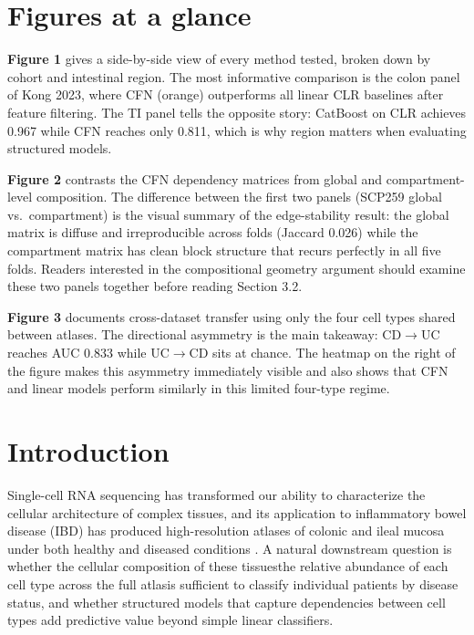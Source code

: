 \documentclass[11pt,letterpaper]{article}
\begin{document}
\section*{Figures at a glance}

\textbf{Figure 1} gives a side-by-side view of every method tested, broken
down by cohort and intestinal region. The most informative comparison is the
colon panel of Kong 2023, where CFN (orange) outperforms all linear CLR
baselines after feature filtering. The TI panel tells the opposite story:
CatBoost on CLR achieves 0.967 while CFN reaches only 0.811, which is why
region matters when evaluating structured models.

\textbf{Figure 2} contrasts the CFN dependency matrices from global and
compartment-level composition. The difference between the first two panels
(SCP259 global vs.\ compartment) is the visual summary of the edge-stability
result: the global matrix is diffuse and irreproducible across folds (Jaccard
0.026) while the compartment matrix has clean block structure that recurs
perfectly in all five folds. Readers interested in the compositional geometry
argument should examine these two panels together before reading Section 3.2.

\textbf{Figure 3} documents cross-dataset transfer using only the four cell
types shared between atlases. The directional asymmetry is the main takeaway:
CD$\rightarrow$UC reaches AUC 0.833 while UC$\rightarrow$CD sits at chance.
The heatmap on the right of the figure makes this asymmetry immediately visible
and also shows that CFN and linear models perform similarly in this limited
four-type regime.

\section{Introduction}

Single-cell RNA sequencing has transformed our ability to characterize the
cellular architecture of complex tissues, and its application to inflammatory
bowel disease (IBD) has produced high-resolution atlases of colonic and ileal
mucosa under both healthy and diseased conditions
\citep{smillie2019intra,kong2023single}. A natural downstream question is
whether the cellular composition of these tissues\textemdash{}the relative abundance of
each cell type across the full atlas\textemdash{}is sufficient to classify individual
patients by disease status, and whether structured models that capture
dependencies between cell types add predictive value beyond simple linear
classifiers.
\end{document}
